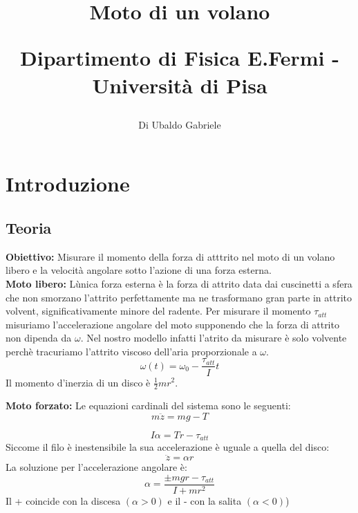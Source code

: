 \documentclass[a4paper,10pt]{article}
\title{Moto di un volano\\
\begin{large}
Dipartimento di Fisica E.Fermi - Università di Pisa
\end{large}}
\author{Di Ubaldo Gabriele}
\date{}
\begin{document}
\maketitle

\tableofcontents

\section{Introduzione}
\subsection{Teoria}
\textbf{Obiettivo:} Misurare il momento della forza di atttrito nel moto di un volano libero e la velocità angolare sotto l'azione di una forza esterna.\\
\textbf{Moto libero:} Lùnica forza esterna è la forza di attrito data dai cuscinetti a sfera che non smorzano l'attrito perfettamente ma ne trasformano gran parte in attrito volvent, significativamente
minore del radente. Per misurare il momento $\tau_{att}$ misuriamo l'accelerazione angolare del moto supponendo che la forza di attrito non dipenda da $\omega$. Nel nostro modello infatti l'atrito da misurare è solo volvente perchè tracuriamo l'attrito viscoso dell'aria proporzionale a $\omega$.
\begin{equation}
 \omega(t)=\omega_0-\frac{\tau_{att}}{I}t
\end{equation}
Il momento d'inerzia di un disco è $\frac{1}{2}mr^2$.

\textbf{Moto forzato:} Le equazioni cardinali del sistema sono le seguenti:
\begin{equation}
 m\ddot{z}=mg-T
\end{equation}

\begin{equation}
 I\alpha=Tr-\tau_{att}
\end{equation}
Siccome il filo è inestensibile la sua accelerazione è uguale a quella del disco:
\begin{equation}
 \ddot{z}=\alpha r
\end{equation}
La soluzione per l'accelerazione angolare è:
\begin{equation}
 \alpha=\frac{\pm mgr-\tau_{att}}{I+mr^2}
\end{equation}
Il + coincide con la discesa $(\alpha>0)$ e il - con la salita $(\alpha<0)$)
\end{document}
